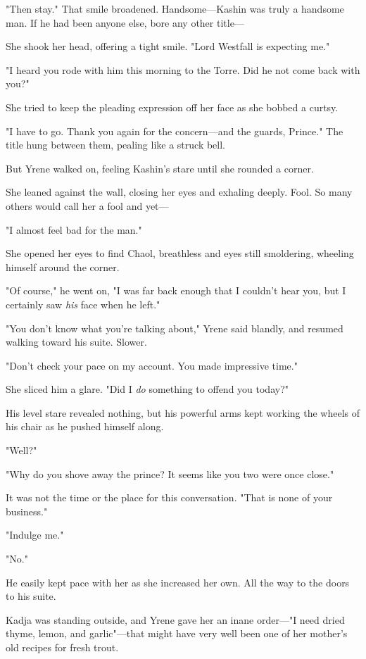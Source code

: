 "Then stay." That smile broadened. Handsome---Kashin was truly a handsome man. If he had been anyone else, bore any other title---

She shook her head, offering a tight smile. "Lord Westfall is expecting me."

"I heard you rode with him this morning to the Torre. Did he not come back with you?"

She tried to keep the pleading expression off her face as she bobbed a curtsy.

"I have to go. Thank you again for the concern---and the guards, Prince." The title hung between them, pealing like a struck bell.

But Yrene walked on, feeling Kashin's stare until she rounded a corner.

She leaned against the wall, closing her eyes and exhaling deeply. Fool. So many others would call her a fool and yet---

"I almost feel bad for the man."

She opened her eyes to find Chaol, breathless and eyes still smoldering, wheeling himself around the corner.

"Of course," he went on, "I was far back enough that I couldn't hear you, but I certainly saw \emph{his} face when he left."

"You don't know what you're talking about," Yrene said blandly, and resumed walking toward his suite. Slower.

"Don't check your pace on my account. You made impressive time."

She sliced him a glare. "Did I \emph{do} something to offend you today?"

His level stare revealed nothing, but his powerful arms kept working the wheels of his chair as he pushed himself along.

"Well?"

"Why do you shove away the prince? It seems like you two were once close."

It was not the time or the place for this conversation. "That is none of your business."

"Indulge me."

"No."

He easily kept pace with her as she increased her own. All the way to the doors to his suite.

Kadja was standing outside, and Yrene gave her an inane order---"I need dried thyme, lemon, and garlic"---that might have very well been one of her mother's old recipes for fresh trout.

